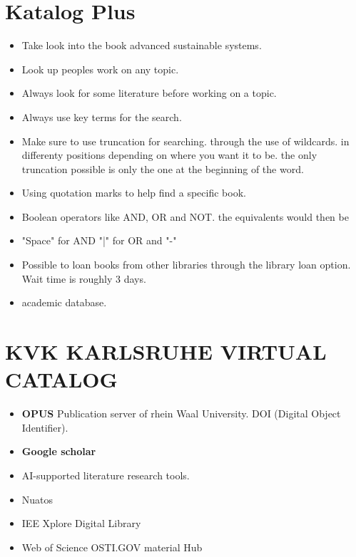 \documentclass[11pt, a4paper]{article}
\begin{document}
\setcounter{page}{1}

\tableofcontents
\newpage
{}
\setcounter{page}{1}
\section{Katalog Plus}
\begin{itemize}
  \item Take look into the book  advanced sustainable systems.
  \item Look up peoples work on any topic.
  \item Always look for some literature before working on a topic.
  \item Always use key terms for the search.
  \item Make sure to use truncation for searching. through the use of wildcards.
        in differenty positions depending on where you want it to be.
        the only truncation possible is only the one at the beginning of the word.

  \item Using quotation marks to help find a specific book.
  \item Boolean operators  like AND, OR and NOT. the equivalents would then be
  \item "Space" for AND "|" for OR and "-"
  \item Possible to loan books from other libraries through the library loan option. Wait time is
        roughly 3 days.
  \item academic database.
\end{itemize}

\section{KVK KARLSRUHE VIRTUAL CATALOG}
\begin{itemize}
  \item \textbf{OPUS} Publication server of rhein Waal University.
        DOI (Digital Object Identifier).
  \item \textbf{Google scholar}
  \item AI-supported literature research tools.
  \item Nuatos
  \item IEE Xplore Digital Library
  \item Web of Science
        OSTI.GOV
        material Hub

\end{itemize}
\end{document}
